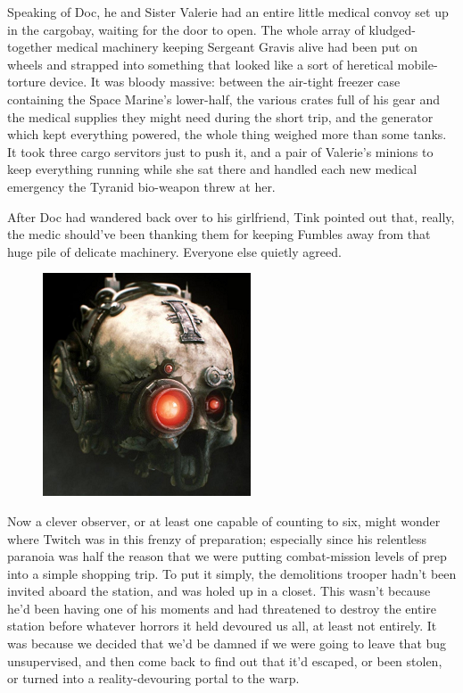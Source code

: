 Speaking of Doc, he and Sister Valerie had an entire little medical convoy set up in the cargobay, waiting for the door to open. 
The whole array of kludged-together medical machinery keeping Sergeant Gravis alive had been put on wheels and strapped into something that looked like a sort of heretical mobile-torture device. 
It was bloody massive: 
between the air-tight freezer case containing the Space Marine's lower-half, the various crates full of his gear and the medical supplies they might need during the short trip, and the generator which kept everything powered, the whole thing weighed more than some tanks. 
It took three cargo servitors just to push it, and a pair of Valerie's minions to keep everything running while she sat there and handled each new medical emergency the Tyranid bio-weapon threw at her. 


After Doc had wandered back over to his girlfriend, Tink pointed out that, really, the medic should've been thanking them for keeping Fumbles away from that huge pile of delicate machinery. 
Everyone else quietly agreed.

\begin{figure}
	\begin{center}
		\includegraphics[width=\figwidth]{pics/14/7.png}
	\end{center}
\end{figure}
Now a clever observer, or at least one capable of counting to six, might wonder where Twitch was in this frenzy of preparation; 
especially since his relentless paranoia was half the reason that we were putting combat-mission levels of prep into a simple shopping trip. 
To put it simply, the demolitions trooper hadn't been invited aboard the station, and was holed up in a closet. 
This wasn't because he'd been having one of his moments and had threatened to destroy the entire station before whatever horrors it held devoured us all, at least not entirely. 
It was because we decided that we'd be damned if we were going to leave that bug unsupervised, and then come back to find out that it'd escaped, or been stolen, or turned into a reality-devouring portal to the warp. 


